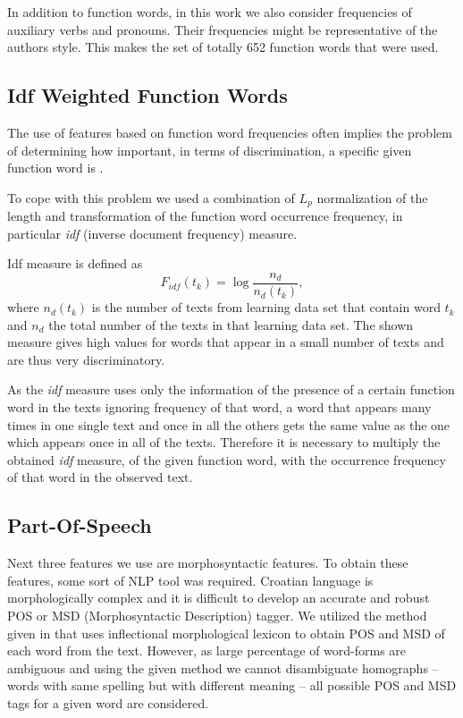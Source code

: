 \documentclass{llncs}
\begin{document}
In addition to function words, in this work we also consider frequencies of
auxiliary verbs and pronouns. Their frequencies might be
representative of the authors style. This makes the set of totally
652 function words that were used.

\subsection{Idf Weighted Function Words}
\label{sec:funkcijske-rijeci-idf}

The use of features based on function word frequencies often implies the
problem of determining how important, in terms of discrimination, a
specific given function word is \cite{diederich2003authorship}.

To cope with this problem we used a combination of $L_p$ normalization of the
length and transformation of the function word occurrence frequency, in
particular \emph{idf} (inverse document frequency) measure.

Idf measure is defined as \cite{diederich2003authorship}
\begin{equation}
F_{idf}(t_k) = \log \frac{n_d}{n_d(t_k)},
\label{equ:idf}
\end{equation}
where $n_d(t_k)$ is the number of texts from learning data set that contain word
$t_k$ and $n_d$ the total number of the texts in that learning data set. The
shown measure gives high values for words that appear in a small number of
texts and are thus very discriminatory.

As the \emph{idf} measure uses only the information of the presence of a
certain function word in the texts ignoring frequency of that word, a word that appears
many times in one single text and once in all the others gets the same value as
the one which appears once in all of the texts. Therefore it is necessary to
multiply the obtained \emph{idf} measure, of the given function word, with the
occurrence frequency of that word in the observed text.

\subsection{Part-Of-Speech}
\label{sec:rijeci-grupe}
Next three features we use are morphosyntactic features. To obtain these
features, some sort of NLP tool was required. Croatian language is
morphologically complex and it is difficult to develop an accurate and robust POS
or MSD (Morphosyntactic Description) tagger. We utilized the method given in
\cite{snajder08automatic} that uses inflectional morphological lexicon to obtain
POS and MSD of each word from the text. However, as large percentage of
word-forms are ambiguous and using the given method we cannot disambiguate
homographs -- words with same spelling but with different meaning -- all possible
POS and MSD tags for a given word are considered.
\end{document}
